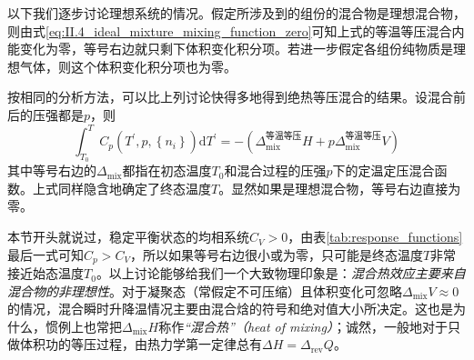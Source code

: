 \documentclass[main.tex]{subfiles}
\begin{document}
以下我们逐步讨论理想系统的情况。假定所涉及到的组份的混合物是理想混合物，则由式\eqref{eq:II.4_ideal_mixture_mixing_function_zero}可知上式的等温等压混合内能变化为零，等号右边就只剩下体积变化积分项。若进一步假定各组份纯物质是理想气体，则这个体积变化积分项也为零。

按相同的分析方法，可以比上列讨论快得多地得到绝热等压混合的结果。设混合前后的压强都是$p$，则
\[\int_{T_0}^TC_p\left(T^\prime,p,\left\{n_i\right\}\right)\mathrm{d}T^\prime=-\left(\Delta_\text{mix}^\text{等温等压}H+p\Delta_\text{mix}^\text{等温等压}V\right)\]
其中等号右边的$\Delta_\text{mix}$都指在初态温度$T_0$和混合过程的压强$p$下的定温定压混合函数。上式同样隐含地确定了终态温度$T$。显然如果是理想混合物，等号右边直接为零。

本节开头就说过，稳定平衡状态的均相系统$C_V>0$，由表\ref{tab:response_functions}最后一式可知$C_p>C_V$，所以如果等号右边很小或为零，只可能是终态温度$T$非常接近始态温度$T_0$。以上讨论能够给我们一个大致物理印象是：\emph{混合热效应主要来自混合物的非理想性}。对于凝聚态（常假定不可压缩）且体积变化可忽略$\Delta_\text{mix}V\approx 0$的情况，混合瞬时升降温情况主要由混合焓的符号和绝对值大小所决定。这也是为什么，惯例上也常把$\Delta_\text{mix}H$称作\emph{“混合热”（heat of mixing）}；诚然，一般地对于只做体积功的等压过程，由热力学第一定律总有$\Delta H=\Delta_\text{rev}Q$。
\end{document}
